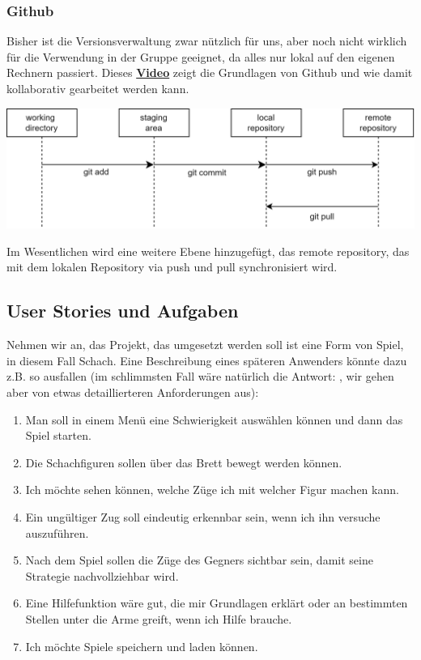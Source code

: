 \documentclass{article}
\begin{document}
\subsubsection{Github}
Bisher ist die Versionsverwaltung zwar nützlich für uns, aber noch nicht wirklich für die Verwendung in der Gruppe geeignet, da alles nur lokal auf den eigenen Rechnern passiert. Dieses \textbf{\href{https://youtu.be/YenryzR6xug}{Video}} zeigt die Grundlagen von Github und wie damit kollaborativ gearbeitet werden kann. 
\begin{center}
    \includegraphics[scale=0.2]{../../media/push_pull.png}
\end{center}
Im Wesentlichen wird eine weitere Ebene hinzugefügt, das remote repository, das mit dem lokalen Repository via push und pull synchronisiert wird.
\subsection{User Stories und Aufgaben}
\label{sec:hwUserStories}

Nehmen wir an, das Projekt, das umgesetzt werden soll ist eine Form von Spiel, in diesem Fall Schach. Eine Beschreibung eines späteren Anwenders könnte dazu z.B. so ausfallen (im schlimmsten Fall wäre natürlich die Antwort: , wir gehen aber von etwas detaillierteren Anforderungen aus):
\begin{enumerate}
    \item Man soll in einem Menü eine Schwierigkeit auswählen können und dann das Spiel starten.
    \item Die Schachfiguren sollen über das Brett bewegt werden können.
    \item Ich möchte sehen können, welche Züge ich mit welcher Figur machen kann. 
    \item Ein ungültiger Zug soll eindeutig erkennbar sein, wenn ich ihn versuche auszuführen. 
    \item Nach dem Spiel sollen die Züge des Gegners sichtbar sein, damit seine Strategie nachvollziehbar wird. 
    \item Eine Hilfefunktion wäre gut, die mir Grundlagen erklärt oder an bestimmten Stellen unter die Arme greift, wenn ich Hilfe brauche. 
    \item Ich möchte Spiele speichern und laden können.
\end{enumerate}
\end{document}
